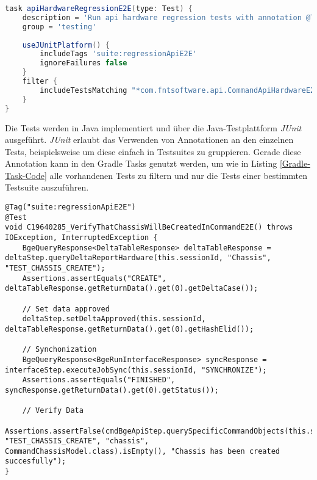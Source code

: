 \begin{lstlisting}[caption=Ein Beispiel eines Gradle Tasks zum Ausführen einer Testsuite, label=Gradle-Task-Code, language=Groovy]
task apiHardwareRegressionE2E(type: Test) {
    description = 'Run api hardware regression tests with annotation @Tag(suite:regressionApiE2E)'
    group = 'testing'
    
    useJUnitPlatform() {
        includeTags 'suite:regressionApiE2E'
        ignoreFailures false
    }
    filter {
        includeTestsMatching "*com.fntsoftware.api.CommandApiHardwareE2ETests*"
    }
}
\end{lstlisting}

Die Tests werden in Java implementiert und über die Java-Testplattform \textit{JUnit} ausgeführt. \textit{JUnit} erlaubt das Verwenden von Annotationen an den einzelnen Tests, beispielsweise um diese einfach in Testsuites zu gruppieren. Gerade diese Annotation kann in den Gradle Tasks genutzt werden, um wie in Listing \ref{Gradle-Task-Code} alle vorhandenen Tests zu filtern und nur die Tests einer bestimmten Testsuite auszuführen. \cite{junit:2021}

\begin{lstlisting}[caption=Ein Test in JUnit mit Annotationen, label=JUnit-Test,style=Javastyle]
@Tag("suite:regressionApiE2E")
@Test
void C19640285_VerifyThatChassisWillBeCreatedInCommandE2E() throws IOException, InterruptedException {
	BgeQueryResponse<DeltaTableResponse> deltaTableResponse = deltaStep.queryDeltaReportHardware(this.sessionId, "Chassis", "TEST_CHASSIS_CREATE");
	Assertions.assertEquals("CREATE", deltaTableResponse.getReturnData().get(0).getDeltaCase());

	// Set data approved
	deltaStep.setDeltaApproved(this.sessionId, deltaTableResponse.getReturnData().get(0).getHashElid());

	// Synchonization
	BgeQueryResponse<BgeRunInterfaceResponse> syncResponse = interfaceStep.executeJobSync(this.sessionId, "SYNCHRONIZE");
	Assertions.assertEquals("FINISHED", syncResponse.getReturnData().get(0).getStatus());

	// Verify Data
	Assertions.assertFalse(cmdBgeApiStep.querySpecificCommandObjects(this.sessionId, "TEST_CHASSIS_CREATE", "chassis", CommandChassisModel.class).isEmpty(), "Chassis has been created succesfully");
}
\end{lstlisting}

